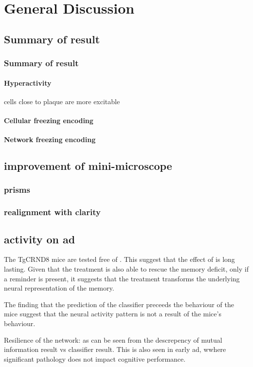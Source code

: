 \chapter{General Discussion}
\section{Summary of result}
\subsection{Summary of result}
\subsubsection{Hyperactivity}
    \citep{busche12} cells close to plaque are more excitable
\subsubsection{Cellular freezing encoding}
\subsubsection{Network freezing encoding}
\section{improvement of mini-microscope}
\subsection{prisms}
\subsection{realignment with clarity}
\section{activity on \gls{ad}}

The TgCRND8 mice are tested free of \tglu. This suggest that the effect of \tglu is long lasting. Given that the \tglu treatment is also able to rescue the memory deficit, only if a reminder is present, it suggests that the \tglu treatment transforms the underlying neural representation of the memory.  

The finding that the prediction of the classifier preceeds the behaviour of the mice suggest that the neural activity pattern is not a result of the mice's behaviour.  

Resilience of the network: as can be seen from the descrepency of mutual information result vs classifier result. This is also seen in early \gls{ad}, wwhere significant pathology does not impact cognitive performance. 

